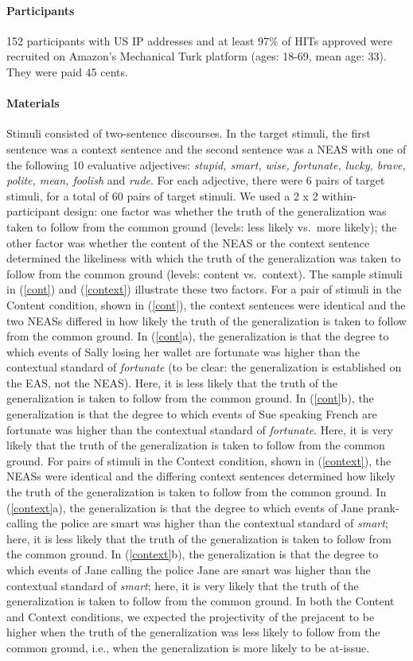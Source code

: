 \documentclass[11pt,fleqn]{article}
\newcommand{\6}{\mbox{$[\hspace*{-.6mm}[$}}
\newcommand{\9}{\mbox{$]\hspace*{-.6mm}]$}}
\begin{document}
\paragraph{Participants} 152 participants with US IP addresses and at least 97\% of HITs approved were recruited on Amazon's Mechanical Turk platform (ages: 18-69, mean age: 33). They were paid 45 cents.

\paragraph{Materials} Stimuli consisted of two-sentence discourses. In the target stimuli, the first sentence was a context sentence and the second sentence was a NEAS with one of the following 10 evaluative adjectives: {\em stupid, smart, wise, fortunate, lucky, brave, polite, mean, foolish} and {\em rude}. For each adjective, there were 6 pairs of target stimuli, for a total of 60 pairs of target stimuli. We used a 2 x 2 within-participant design: one factor was whether the truth of the generalization was taken to follow from the common ground (levels: less likely vs.\ more likely); the other factor was whether the content of the NEAS or the context sentence determined the likeliness with which the truth of the generalization was taken to follow from the common ground (levels: content vs.\ context). The sample stimuli in (\ref{cont}) and (\ref{context}) illustrate these two factors. For a pair of stimuli in the Content condition, shown in (\ref{cont}), the context sentences were identical and the two NEASs differed in how likely the truth of the generalization is taken to follow from the common ground. In (\ref{cont}a), the generalization is that the degree to which events of Sally losing her wallet are fortunate was higher than the contextual standard of {\em fortunate} (to be clear: the generalization is established on the EAS, not the NEAS). Here, it is less likely that the truth of the generalization is taken to follow from the common ground. In (\ref{cont}b), the generalization is that the degree to which events of Sue speaking French are fortunate was higher than the contextual standard of {\em fortunate}. Here, it is very likely that the truth of the generalization is taken to follow from the common ground. For pairs of stimuli in the Context condition, shown in (\ref{context}), the NEASs were identical and the differing context sentences determined how likely the truth of the generalization is taken to follow from the common ground. In (\ref{context}a), the generalization is that the degree to which events of Jane prank-calling the police are smart was higher than the contextual standard of {\em smart}; here, it is less likely that the truth of the generalization is taken to follow from the common ground.  In (\ref{context}b), the generalization is that the degree to which events of Jane calling the police Jane are smart was higher than the contextual standard of {\em smart}; here,  it is very likely that the truth of the generalization is taken to follow from the common ground. In both the Content and Context conditions, we expected the projectivity of the prejacent to be higher when the truth of the generalization was less likely to follow from the common ground, i.e., when the generalization is more likely to be at-issue.
\end{document}
